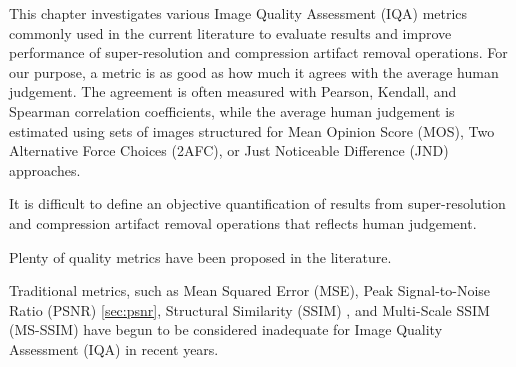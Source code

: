 \label{chap:metrics}







This chapter investigates various Image Quality Assessment (IQA) metrics commonly used in the current literature to evaluate results and improve performance of super-resolution and compression artifact removal operations.
For our purpose, a metric is as good as how much it agrees with the average human judgement.
The agreement is often measured with Pearson, Kendall, and Spearman correlation coefficients, while the average human judgement is estimated using sets of images structured for Mean Opinion Score (MOS), Two Alternative Force Choices (2AFC), or Just Noticeable Difference (JND) approaches.


It is difficult to define an objective quantification of results from super-resolution and compression artifact removal operations that reflects human judgement.

Plenty of quality metrics have been proposed in the literature.

Traditional metrics, such as Mean Squared Error (MSE), Peak Signal-to-Noise Ratio (PSNR) \ref{sec:psnr}, Structural Similarity (SSIM) \cite{wang2004image}, and Multi-Scale SSIM (MS-SSIM) \cite{wang2003multiscale} have begun to be considered inadequate for Image Quality Assessment (IQA) in recent years.

